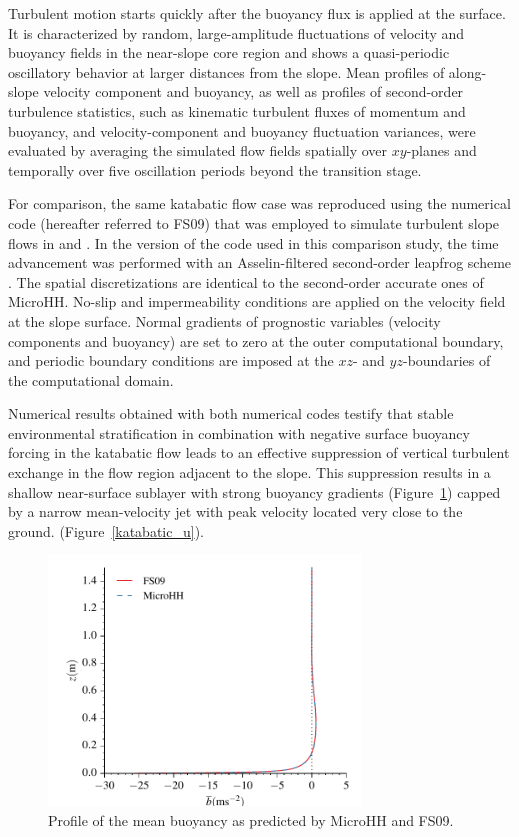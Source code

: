 \documentclass[gmd]{copernicus}
\begin{document}
Turbulent motion starts quickly after the buoyancy flux is applied at the surface. It is characterized by random, large-amplitude fluctuations of velocity and buoyancy fields in the near-slope core region and shows a quasi-periodic oscillatory behavior at larger distances from the slope. Mean profiles of along-slope velocity component and buoyancy, as well as profiles of second-order turbulence statistics, such as kinematic turbulent fluxes of momentum and buoyancy, and velocity-component and buoyancy fluctuation variances, were evaluated by averaging the simulated flow fields spatially over $xy$-planes and temporally over five oscillation periods beyond the transition stage.

For comparison, the same katabatic flow case was reproduced using the numerical code (hereafter referred to FS09) that was employed to simulate turbulent slope flows in \citet{Shapiro2008} and \citet{Fedorovich2009}. In the version of the code used in this comparison study, the time advancement was performed with an Asselin-filtered second-order leapfrog scheme \citep{Durran2013}. The spatial discretizations are identical to the second-order accurate ones of MicroHH. No-slip and impermeability conditions are applied on the velocity field at the slope surface. Normal gradients of prognostic variables (velocity components and buoyancy) are set to zero at the outer computational boundary, and periodic boundary conditions are imposed at the $xz$- and $yz$-boundaries of the computational domain.

Numerical results obtained with both numerical codes testify that stable environmental stratification in combination with negative surface buoyancy forcing in the katabatic flow leads to an effective suppression of vertical turbulent exchange in the flow region adjacent to the slope. This suppression results in a shallow near-surface sublayer with strong buoyancy gradients (Figure~\ref{katabatic_b}) capped by a narrow mean-velocity jet with peak velocity located very close to the ground. (Figure~\ref{katabatic_u}).

\begin{figure}
	\centerline{\includegraphics[width=8.3cm]{figs/katabatic_b.pdf}}
	\caption{Profile of the mean buoyancy as predicted by MicroHH and FS09.}
	\label{katabatic_b}
\end{figure}
\end{document}
